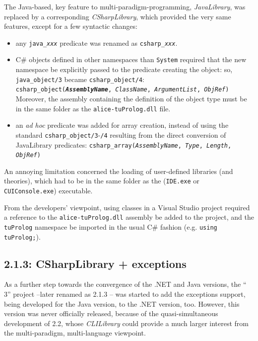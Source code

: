 The Java-based, key feature to multi-paradigm-programming, \textit{JavaLibrary}, was replaced by a corresponding \textit{CSharpLibrary}, which provided the very same features, except for a few syntactic changes:
\begin{itemize}
  \item any \texttt{java\_\textit{xxx}} predicate was renamed as \texttt{csharp\_\textit{xxx}}.

  \item C\# objects defined in other namespaces than \texttt{System} required that the new namespace be explicitly passed to the predicate creating the object: so, \texttt{java\_object/3} became \texttt{csharp\_object/4}:\\
        \texttt{csharp\_object(\textit{\textbf{AssemblyName}}, \textit{ClassName}, \textit{ArgumentList}, \textit{ObjRef})}\\
      Moreover, the assembly containing the definition of the object type must be in the same folder as the \texttt{alice-tuProlog.dll} file.

\item an \textit{ad hoc} predicate was added for array creation, instead of using the standard \texttt{csharp\_object/3}-\texttt{/4} resulting from the direct conversion of JavaLibrary predicates:
    \texttt{csharp\_array(\textit{AssemblyName}, \textit{Type}, \textit{Length}, \textit{ObjRef})}
\end{itemize}

An annoying limitation concerned the loading of user-defined libraries (and theories), which had to be in the same folder as the \tuprolog{} (\texttt{IDE.exe} or \texttt{CUIConsole.exe}) executable.

From the developers' viewpoint, using \tuprolog{} classes in a Visual Studio project required a reference to the \texttt{alice-tuProlog.dll} assembly be added to the project, and the \texttt{tuProlog} namespace be imported in the usual C\# fashion (e.g. \texttt{using tuProlog;}).

\subsection{\tuprolog{} 2.1.3: CSharpLibrary + exceptions}
\label{ssec:dotnet-tuprolog2.1.3}

As a further step towards the convergence of the .NET and Java versions, the ``\tuprolog{} 3'' project --later renamed as 2.1.3 -- was started to add the exceptions support, being developed for the Java version, to the .NET version, too.
However, this version was never officially released, because of the quasi-simultaneous
development of \tuprolog{} 2.2, whose \textit{CLILibrary} could provide a much larger interest from the multi-paradigm, multi-language viewpoint.

